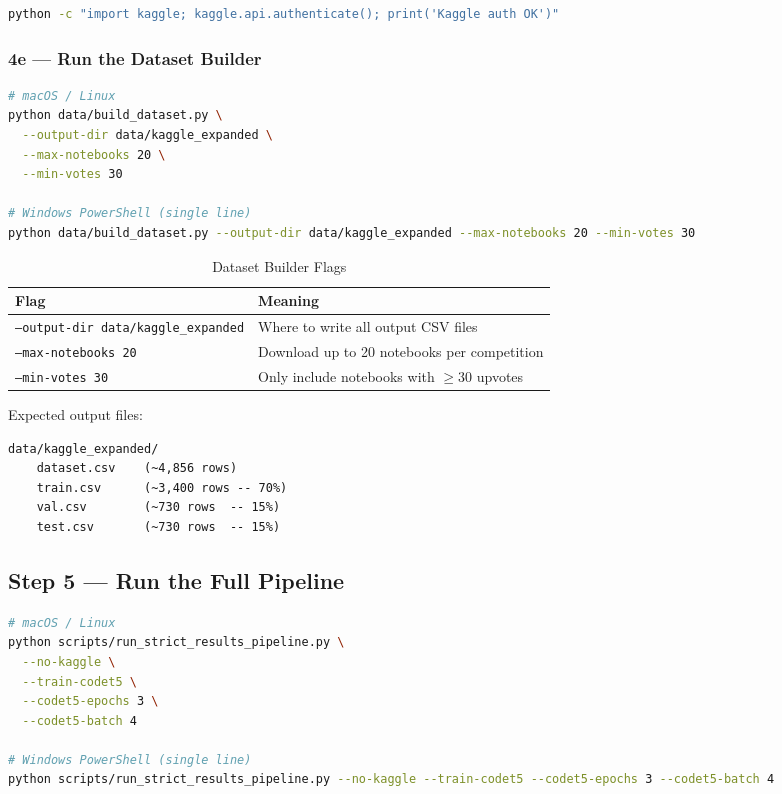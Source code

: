 \documentclass[12pt,a4paper]{article}
\begin{document}
\begin{lstlisting}[language=bash]
python -c "import kaggle; kaggle.api.authenticate(); print('Kaggle auth OK')"
\end{lstlisting}

\subsubsection{4e --- Run the Dataset Builder}

\begin{lstlisting}[language=bash]
# macOS / Linux
python data/build_dataset.py \
  --output-dir data/kaggle_expanded \
  --max-notebooks 20 \
  --min-votes 30

# Windows PowerShell (single line)
python data/build_dataset.py --output-dir data/kaggle_expanded --max-notebooks 20 --min-votes 30
\end{lstlisting}

\begin{table}[h!]
\centering
\caption{Dataset Builder Flags}
\begin{tabular}{ll}
\toprule
Flag & Meaning \\
\midrule
\texttt{--output-dir data/kaggle\_expanded} & Where to write all output CSV files \\
\texttt{--max-notebooks 20} & Download up to 20 notebooks per competition \\
\texttt{--min-votes 30} & Only include notebooks with $\geq$30 upvotes \\
\bottomrule
\end{tabular}
\end{table}

Expected output files:
\begin{lstlisting}[language={}]
data/kaggle_expanded/
    dataset.csv    (~4,856 rows)
    train.csv      (~3,400 rows -- 70%)
    val.csv        (~730 rows  -- 15%)
    test.csv       (~730 rows  -- 15%)
\end{lstlisting}

\subsection{Step 5 --- Run the Full Pipeline}

\begin{lstlisting}[language=bash]
# macOS / Linux
python scripts/run_strict_results_pipeline.py \
  --no-kaggle \
  --train-codet5 \
  --codet5-epochs 3 \
  --codet5-batch 4

# Windows PowerShell (single line)
python scripts/run_strict_results_pipeline.py --no-kaggle --train-codet5 --codet5-epochs 3 --codet5-batch 4
\end{lstlisting}
\end{document}
